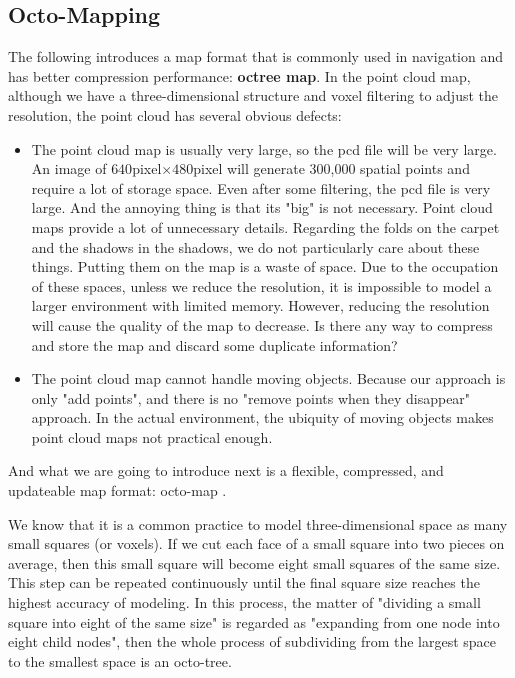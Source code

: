 \subsection{Octo-Mapping}
The following introduces a map format that is commonly used in navigation and has better compression performance: \textbf{octree map}. In the point cloud map, although we have a three-dimensional structure and voxel filtering to adjust the resolution, the point cloud has several obvious defects:
\begin{itemize}
	\item The point cloud map is usually very large, so the pcd file will be very large. An image of $640$pixel$\times480$pixel will generate 300,000 spatial points and require a lot of storage space. Even after some filtering, the pcd file is very large. And the annoying thing is that its "big" is not necessary. Point cloud maps provide a lot of unnecessary details. Regarding the folds on the carpet and the shadows in the shadows, we do not particularly care about these things. Putting them on the map is a waste of space. Due to the occupation of these spaces, unless we reduce the resolution, it is impossible to model a larger environment with limited memory. However, reducing the resolution will cause the quality of the map to decrease. Is there any way to compress and store the map and discard some duplicate information?
	\item The point cloud map cannot handle moving objects. Because our approach is only "add points", and there is no "remove points when they disappear" approach. In the actual environment, the ubiquity of moving objects makes point cloud maps not practical enough.
\end{itemize}

And what we are going to introduce next is a flexible, compressed, and updateable map format: octo-map {\cite{Hornung2013}}.

We know that it is a common practice to model three-dimensional space as many small squares (or voxels). If we cut each face of a small square into two pieces on average, then this small square will become eight small squares of the same size. This step can be repeated continuously until the final square size reaches the highest accuracy of modeling. In this process, the matter of "dividing a small square into eight of the same size" is regarded as "expanding from one node into eight child nodes", then the whole process of subdividing from the largest space to the smallest space is an octo-tree.

